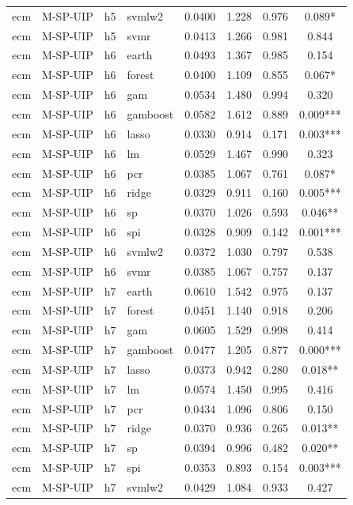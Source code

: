 \begin{ThreePartTable}
\begin{longtable}[t]{llclcccc}
ecm & M-SP-UIP & h5 & svmlw2 & 0.0400 & 1.228 & 0.976 & 0.089*\\
ecm & M-SP-UIP & h5 & svmr & 0.0413 & 1.266 & 0.981 & 0.844\\
\addlinespace
ecm & M-SP-UIP & h6 & earth & 0.0493 & 1.367 & 0.985 & 0.154\\
ecm & M-SP-UIP & h6 & forest & 0.0400 & 1.109 & 0.855 & 0.067*\\
ecm & M-SP-UIP & h6 & gam & 0.0534 & 1.480 & 0.994 & 0.320\\
ecm & M-SP-UIP & h6 & gamboost & 0.0582 & 1.612 & 0.889 & 0.009***\\
ecm & M-SP-UIP & h6 & lasso & 0.0330 & 0.914 & 0.171 & 0.003***\\
ecm & M-SP-UIP & h6 & lm & 0.0529 & 1.467 & 0.990 & 0.323\\
ecm & M-SP-UIP & h6 & pcr & 0.0385 & 1.067 & 0.761 & 0.087*\\
ecm & M-SP-UIP & h6 & ridge & 0.0329 & 0.911 & 0.160 & 0.005***\\
ecm & M-SP-UIP & h6 & sp & 0.0370 & 1.026 & 0.593 & 0.046**\\
ecm & M-SP-UIP & h6 & spi & 0.0328 & 0.909 & 0.142 & 0.001***\\
ecm & M-SP-UIP & h6 & svmlw2 & 0.0372 & 1.030 & 0.797 & 0.538\\
ecm & M-SP-UIP & h6 & svmr & 0.0385 & 1.067 & 0.757 & 0.137\\
\addlinespace
ecm & M-SP-UIP & h7 & earth & 0.0610 & 1.542 & 0.975 & 0.137\\
ecm & M-SP-UIP & h7 & forest & 0.0451 & 1.140 & 0.918 & 0.206\\
ecm & M-SP-UIP & h7 & gam & 0.0605 & 1.529 & 0.998 & 0.414\\
ecm & M-SP-UIP & h7 & gamboost & 0.0477 & 1.205 & 0.877 & 0.000***\\
ecm & M-SP-UIP & h7 & lasso & 0.0373 & 0.942 & 0.280 & 0.018**\\
ecm & M-SP-UIP & h7 & lm & 0.0574 & 1.450 & 0.995 & 0.416\\
ecm & M-SP-UIP & h7 & pcr & 0.0434 & 1.096 & 0.806 & 0.150\\
ecm & M-SP-UIP & h7 & ridge & 0.0370 & 0.936 & 0.265 & 0.013**\\
ecm & M-SP-UIP & h7 & sp & 0.0394 & 0.996 & 0.482 & 0.020**\\
ecm & M-SP-UIP & h7 & spi & 0.0353 & 0.893 & 0.154 & 0.003***\\
ecm & M-SP-UIP & h7 & svmlw2 & 0.0429 & 1.084 & 0.933 & 0.427\\

\end{longtable}
\end{ThreePartTable}
